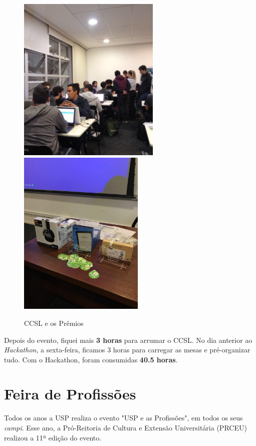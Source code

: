 \documentclass[12pt,letterpaper]{article}
\begin{document}
	\begin{figure}
		\begin{center}
			\includegraphics[height=8cm]{hack.jpg}  
			\includegraphics[height=8cm]{premio.jpg}
			\caption{CCSL e os Prêmios} 
		\end{center}
	\end{figure}	 
	
	Depois do evento, fiquei mais \textbf{3 horas} para arrumar o CCSL. No dia anterior ao \textit{Hackathon}, a sexta-feira, ficamos 3 horas para carregar as mesas e pré-organizar tudo. Com o Hackathon, foram consumidas \textbf{40.5 horas}.
	
	\section{Feira de Profissões}
	
	Todos os anos a USP realiza o evento "USP e as Profissões", em todos os seus \textit{campi}. Esse ano, a Pró-Reitoria de Cultura e Extensão Universitária (PRCEU) realizou a 11ª edição do evento.
	
\end{document}
